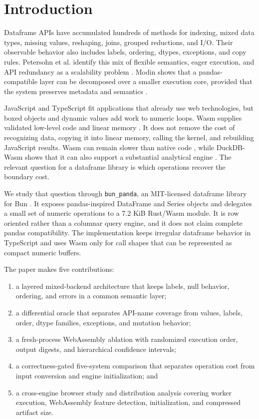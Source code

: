 \documentclass[pdflatex,sn-basic,Numbered]{sn-jnl}
\begin{document}
\section{Introduction}\label{sec:introduction}

Dataframe APIs have accumulated hundreds of methods for indexing, mixed data types, missing values, reshaping, joins, grouped reductions, and I/O. Their observable behavior also includes labels, ordering, dtypes, exceptions, and copy rules. Petersohn et al. identify this mix of flexible semantics, eager execution, and API redundancy as a scalability problem \cite{petersohn2020scalable}. Modin shows that a pandas-compatible layer can be decomposed over a smaller execution core, provided that the system preserves metadata and semantics \cite{petersohn2021modin}.

JavaScript and TypeScript fit applications that already use web technologies, but boxed objects and dynamic values add work to numeric loops. Wasm supplies validated low-level code and linear memory \cite{haas2017webassembly,wasmcore2}. It does not remove the cost of recognizing data, copying it into linear memory, calling the kernel, and rebuilding JavaScript results. Wasm can remain slower than native code \cite{jangda2019notsofast}, while DuckDB-Wasm shows that it can also support a substantial analytical engine \cite{kohn2022duckdbwasm}. The relevant question for a dataframe library is which operations recover the boundary cost.

We study that question through \texttt{bun\_panda}, an MIT-licensed dataframe library for Bun \cite{bun140}. It exposes pandas-inspired DataFrame and Series objects and delegates a small set of numeric operations to a 7.2 KiB Rust/Wasm module. It is row oriented rather than a columnar query engine, and it does not claim complete pandas compatibility. The implementation keeps irregular dataframe behavior in TypeScript and uses Wasm only for call shapes that can be represented as compact numeric buffers.

The paper makes five contributions:

\begin{enumerate}
\item a layered mixed-backend architecture that keeps labels, null behavior, ordering, and errors in a common semantic layer;
\item a differential oracle that separates API-name coverage from values, labels, order, dtype families, exceptions, and mutation behavior;
\item a fresh-process WebAssembly ablation with randomized execution order, output digests, and hierarchical confidence intervals;
\item a correctness-gated five-system comparison that separates operation cost from input conversion and engine initialization; and
\item a cross-engine browser study and distribution analysis covering worker execution, WebAssembly feature detection, initialization, and compressed artifact size.
\end{enumerate}
\end{document}
